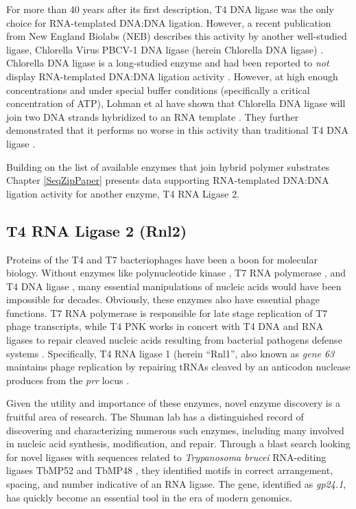     For more than 40 years after its first description, T4 DNA ligase was the only choice for RNA-templated DNA:DNA ligation. However, a recent publication from New England Biolabs (NEB) describes this activity by another well-studied ligase, Chlorella Virus PBCV-1 DNA ligase (herein Chlorella DNA ligase) \citep{Lohman2013c}. Chlorella DNA ligase is a long-studied enzyme and had been reported to \textit{not} display RNA-templated DNA:DNA ligation activity \citep{Ho1997b,Sriskanda1998c}. However, at high enough concentrations and under special buffer conditions (specifically a critical concentration of ATP), Lohman et al have shown that Chlorella DNA ligase will join two DNA strands hybridized to an RNA template \citep{Lohman2013c}. They further demonstrated that it performs no worse in this activity than traditional T4 DNA ligase \citep{Nilsson2001,Yeakley2002}.

    Building on the list of available enzymes that join hybrid polymer substrates Chapter \ref{SeqZipPaper} presents data supporting RNA-templated DNA:DNA ligation activity for another enzyme, T4 RNA Ligase 2.

  \subsection{T4 RNA Ligase 2 (Rnl2)}
    \label{Intro:subsec:Rnl2}

    Proteins of the T4 and T7 bacteriophages have been a boon for molecular biology. Without enzymes like polynucleotide kinase \citep{Richardson1965a}, T7 RNA polymerase \citep{Summers1970b}, and T4 DNA ligase \citep{Weiss1967a}, many essential manipulations of nucleic acids would have been impossible for decades. Obviously, these enzymes also have essential phage functions. T7 RNA polymerase is responsible for late stage replication of T7 phage transcripts, while T4 PNK works in concert with T4 DNA and RNA ligases to repair cleaved  nucleic acids resulting from bacterial pathogens defense systems \citep{Wang2002b}. Specifically, T4 RNA ligase 1 (herein ``Rnl1'', also known as \textit{gene 63} maintains phage replication by repairing tRNAs cleaved by an anticodon nuclease produces from the \textit{prr} locus \citep{Amitsur1987d}.

    Given the utility and importance of these enzymes, novel enzyme discovery is a fruitful area of research. The Shuman lab has a distinguished record of discovering and characterizing numerous such enzymes, including many involved in nucleic acid synthesis, modification, and repair. Through a blast search looking for novel ligases with sequences related to \textit{Trypanosoma brucei} RNA-editing ligases TbMP52 and TbMP48 \citep{Ho2002b}, they identified motifs in correct arrangement, spacing, and number indicative of an RNA ligase. The gene, identified as \textit{gp24.1}, has quickly become an essential tool in the era of modern genomics.

